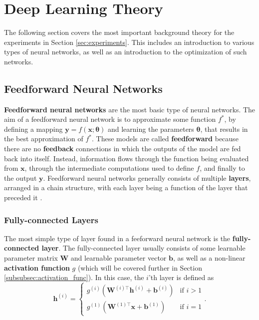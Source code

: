 \documentclass[./main.tex]{subfiles}
\begin{document}
\section{Deep Learning Theory}
The following section covers the most important background theory for the experiments in Section \ref{sec:experiments}. This includes an introduction to various types of neural networks, as well as an introduction to the optimization of such networks.

\subsection{Feedforward Neural Networks}
\textbf{Feedforward neural networks} are the most basic type of neural networks. The aim of a feedforward neural network is to approximate some function $f^*$, by defining a mapping $\bm{y} = f(\bm{x}; \bm{\theta})$ and learning the parameters $\bm{\theta}$, that results in the best approximation of $f^*$. These models are called \textbf{feedforward} because there are no \textbf{feedback} connections in which the outputs of the model are fed back into itself. Instead, information flows through the function being evaluated from $\bm{x}$, through the intermediate computations used to define $f$, and finally to the output $\bm{y}$. Feedforward neural networks generally consists of multiple \textbf{layers}, arranged in a chain structure, with each layer being a function of the layer that preceded it \cite{DL_book}. 

\subsubsection{Fully-connected Layers}
The most simple type of layer found in a feeforward neural network is the \textbf{fully-connected layer}. The fully-connected layer usually consists of some learnable parameter matrix $\bm{W}$ and learnable parameter vector $\bm{b}$, as well as a non-linear \textbf{activation function} $g$ (which will be covered further in Section \ref{subsubsec:activation_func}). In this case, the $i$'th layer is defined as \cite{DL_book}
\begin{equation}
    \bm{h}^{(i)} =
    \begin{cases}
        g^{(i)} \left( \bm{W}^{(i) \top} \bm{h}^{(i)} + \bm{b}^{(i)} \right) & \text{if } i > 1 \\
        g^{(1)} \left( \bm{W}^{(1) \top} \bm{x} + \bm{b}^{(1)} \right) & \text{if } i = 1
    \end{cases}
    .
\end{equation}
\end{document}
